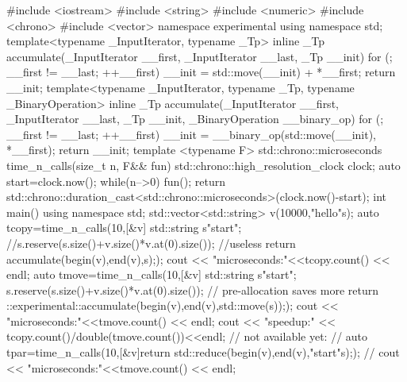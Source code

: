 \documentclass[ebook,11pt,article]{memoir}
\begin{document}
\begin{codeblock}
#include <iostream>
#include <string>
#include <numeric>
#include <chrono>
#include <vector>
namespace experimental {
using namespace std;
template<typename _InputIterator, typename _Tp>
inline _Tp accumulate(_InputIterator __first, _InputIterator __last, _Tp __init){
    for (; __first != __last; ++__first)
	__init = std::move(__init) + *__first;
    return __init;
}
template<typename _InputIterator, typename _Tp, typename _BinaryOperation>
inline _Tp accumulate(_InputIterator __first, _InputIterator __last, _Tp __init,
	       _BinaryOperation __binary_op){
    for (; __first != __last; ++__first)
	__init = __binary_op(std::move(__init), *__first);
    return __init;
}
}
template <typename F>
std::chrono::microseconds time_n_calls(size_t n, F&& fun){
	std::chrono::high_resolution_clock clock{};
	auto start=clock.now();
	while(n-->0){
		fun();
	}
	return std::chrono::duration_cast<std::chrono::microseconds>(clock.now()-start);
}
int main() {
    using namespace std;
    std::vector<std::string> v(10000,"hello"s);
    auto tcopy=time_n_calls(10,[&v]{
		std::string s{"start"};
		//s.reserve(s.size()+v.size()*v.at(0).size()); //useless
		return accumulate(begin(v),end(v),s);});
    cout << "microseconds:"<<tcopy.count() << endl;
    auto tmove=time_n_calls(10,[&v]{
		std::string s{"start"};
		s.reserve(s.size()+v.size()*v.at(0).size()); // pre-allocation saves more
		return ::experimental::accumulate(begin(v),end(v),std::move(s));});
    cout << "microseconds:"<<tmove.count() << endl;
    cout << "speedup:" << tcopy.count()/double(tmove.count())<<endl;
    // not available yet:
    //	auto tpar=time_n_calls(10,[\&v]{return std::reduce(begin(v),end(v),"start"s);});
    //	cout << "microseconds:"<<tmove.count() << endl;
}
\end{codeblock}
\end{document}
